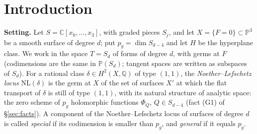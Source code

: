 \documentclass[11pt]{article}
\numberwithin{equation}{section}
\theoremstyle{remark}
\newcommand{\PP}{\mathbb{P}}
\newcommand{\CC}{\mathbb{C}}
\newcommand{\QQ}{\mathbb{Q}}
\newcommand{\NL}{\mathrm{NL}}
\newcommand{\run}[1]{\medskip\noindent\textbf{#1}}
\begin{document}
\section{Introduction}\label{sec:intro}

\run{Setting.}
Let $S=\CC[x_0,\dots,x_3]$, with graded pieces $S_j$, and let $X=\{F=0\}\subset\PP^3$ be a smooth surface of
degree $d$; put $p_g=\dim S_{d-4}$ and let $H$ be the hyperplane class. We work in the space $T=S_d$ of forms of
degree $d$, with germs at $F$ (codimensions are the same in $\PP(S_d)$; tangent spaces are written as subspaces of
$S_d$). For a rational class $\delta\in H^2(X,\QQ)$ of type $(1,1)$, the \emph{Noether--Lefschetz locus}
$\NL(\delta)$ is the germ at $X$ of the set of surfaces $X'$ at which the flat transport of $\delta$ is still of
type $(1,1)$, with its natural structure of analytic space: the zero scheme of $p_g$ holomorphic functions
$\Phi_Q$, $Q\in S_{d-4}$ (fact (G1) of \S\ref{sec:facts}). A component of the Noether--Lefschetz locus of
surfaces of degree $d$ is called \emph{special} if its codimension is smaller than $p_g$, and \emph{general} if it
equals $p_g$.
\end{document}
